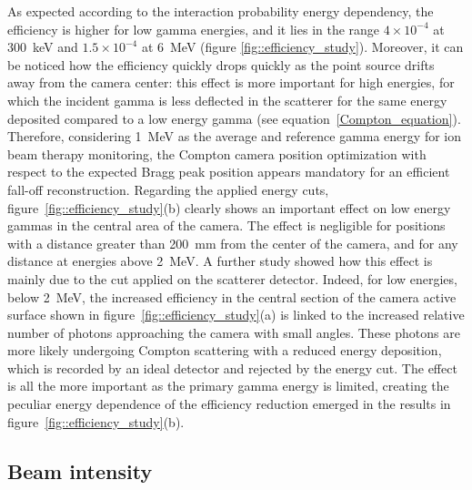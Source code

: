 As expected according to the interaction probability energy dependency, the efficiency is higher for low gamma energies, and it lies in the range $4\times10^{-4}$ at 300~keV and $1.5\times10^{-4}$ at 6~MeV (figure \ref{fig::efficiency_study}). Moreover, it can be noticed how the efficiency quickly drops quickly as the point source drifts away from the camera center: this effect is more important for high energies, for which the incident gamma is less deflected in the scatterer for the same energy deposited compared to a low energy gamma (see equation~\ref{Compton_equation}). Therefore, considering 1~MeV as the average and reference gamma energy for ion beam therapy monitoring, the Compton camera position optimization with respect to the expected Bragg peak position appears mandatory for an efficient fall-off reconstruction.\newline
Regarding the applied energy cuts, figure~\ref{fig::efficiency_study}(b) clearly shows an important effect on low energy gammas in the central area of the camera. The effect is negligible for positions with a distance greater than 200~mm from the center of the camera, and for any distance at energies above 2~MeV. A further study showed how this effect is mainly due to the cut applied on the scatterer detector. Indeed, for low energies, below 2~MeV, the increased efficiency in the central section of the camera active surface shown in figure~\ref{fig::efficiency_study}(a) is linked to the increased relative number of photons approaching the camera with small angles. These photons are more likely undergoing Compton scattering with a reduced energy deposition, which is recorded by an ideal detector and rejected by the energy cut. The effect is all the more important as the primary gamma energy is limited, creating the peculiar energy dependence of the efficiency reduction emerged in the results in figure~\ref{fig::efficiency_study}(b).\\ 

\subsection{Beam intensity}
\label{Results::beamInt}

